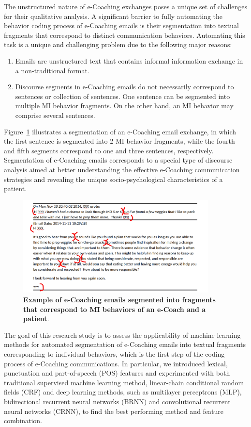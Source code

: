 \documentclass{amia}
\begin{document}
The unstructured nature of e-Coaching exchanges poses a unique set of challenges for their qualitative analysis. A significant barrier to fully automating the behavior coding process of e-Coaching emails is their segmentation into textual fragments that correspond to distinct communication behaviors. Automating this task is a unique and challenging problem due to the following major reasons:

\begin{enumerate}
\item Emails are unstructured text that contains informal information exchange in a non-traditional format.
\item Discourse segments in e-Coaching emails do not necessarily correspond to sentences or collection of sentences. One sentence can be segmented into multiple MI behavior fragments. On the other hand, an MI behavior may comprise several sentences.
\end{enumerate}

Figure~\ref{fig:text-segment} illustrates a segmentation of an e-Coaching email exchange, in which the first sentence is segmented into 2 MI behavior fragments, while the fourth and fifth segments correspond to one and three sentences, respectively. Segmentation of e-Coaching emails corresponds to a special type of discourse analysis \cite{webber2012discourse} aimed at better understanding the effective e-Coaching communication strategies and revealing the unique socio-psychological characteristics of a patient.

\begin{figure}[!htb]
    \centering
    \includegraphics[width=0.9\textwidth]{figures/segment-example.png}
    \caption{\textbf{Example of e-Coaching emails segmented into fragments that correspond to MI behaviors of an e-Coach and a patient}.}
    \label{fig:text-segment}
\end{figure}

The goal of this research study is to assess the applicability of machine learning methods for automated segmentation of e-Coaching emails into textual fragments corresponding to individual behaviors, which is the first step of the coding process of e-Coaching communications. In particular, we introduced lexical, punctuation and  part-of-speech (POS) features and experimented with both traditional supervised machine learning method, linear-chain conditional random fields (CRF) and deep learning methods, such as multilayer perceptrons (MLP), bidirectional recurrent neural networks (BRNN) and convolutional recurrent neural networks (CRNN), to find the best performing method and feature combination. 
\end{document}
